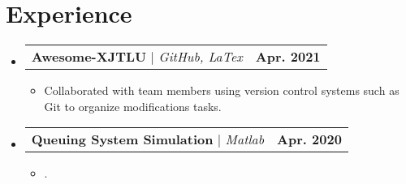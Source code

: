 \documentclass[letterpaper,11pt]{article}
\makeatletter
\newcommand{\resumeItem}[1]{
  \item\small{
    {#1 \vspace{-2pt}}
  }
}
\newcommand{\resumeProjectHeading}[2]{
    \item
    \begin{tabular*}{1.001\textwidth}{l@{\extracolsep{\fill}}r}
      \small#1 & \textbf{\small #2}\\
    \end{tabular*}\vspace{-7pt}
}
\newcommand{\resumeSubHeadingListStart}{\begin{itemize}[leftmargin=0.0in, label={}]}
\newcommand{\resumeSubHeadingListEnd}{\end{itemize}}
\newcommand{\resumeItemListStart}{\begin{itemize}}
\newcommand{\resumeItemListEnd}{\end{itemize}\vspace{-5pt}}
\makeatother
\begin{document}
\section{Experience}
    \vspace{-5pt}
    \resumeSubHeadingListStart
      \resumeProjectHeading
          {\textbf{Awesome-XJTLU} $|$ \emph{GitHub, LaTex}}{Apr. 2021}
          \resumeItemListStart
            \resumeItem{Collaborated with team members using version control systems such as Git to organize modifications tasks.}
          \resumeItemListEnd
          \vspace{-13pt}
      \resumeProjectHeading
          {\textbf{Queuing System Simulation} $|$ \emph{Matlab}}{Apr. 2020}
          \resumeItemListStart
            \resumeItem{.}
          \resumeItemListEnd 
    \resumeSubHeadingListEnd
\vspace{-15pt}
\end{document}
